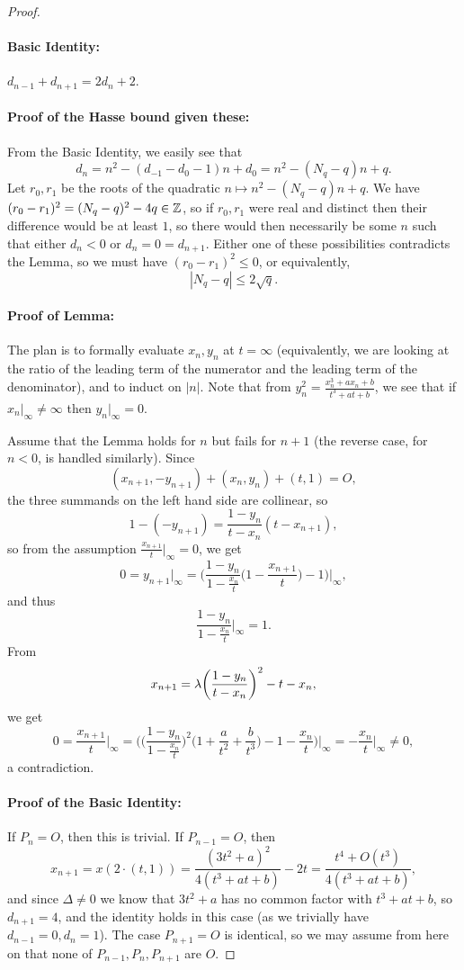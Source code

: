 \begin{proof}
\paragraph{Basic Identity:} $d_{n-1} + d_{n+1} = 2d_n + 2$.
\paragraph{Proof of the Hasse bound given these:} From the Basic Identity, we easily see that
\[
d_n = n^2 - (d_{-1}-d_0-1)n + d_0 = n^2 - (N_q-q)n + q.
\]
Let $r_0, r_1$ be the roots of the quadratic $n\mapsto n^2 - (N_q-q)n + q$. We have $(r_0-r_1)^2 = (N_q-q)^2-4q \in \mathbb{Z}$, so if $r_0,r_1$ were real and distinct then their difference would be at least $1$, so there would then necessarily be some $n$ such that either $d_n < 0$ or $d_n = 0 = d_{n+1}$. Either one of these possibilities contradicts the Lemma, so we must have $(r_0-r_1)^2 \le 0$, or equivalently,
\[
|N_q-q| \le 2\sqrt{q}.
\]
\paragraph{Proof of Lemma:} The plan is to formally evaluate $x_n, y_n$ at $t=\infty$ (equivalently, we are looking at the ratio of the leading term of the numerator and the leading term of the denominator), and to induct on $|n|$. Note that from $y_n^2 = \frac{x_n^3+ax_n+b}{t^3+at+b}$, we see that if $x_n|_\infty \ne \infty$ then $y_n|_\infty = 0$.

Assume that the Lemma holds for $n$ but fails for $n+1$ (the reverse case, for $n < 0$, is handled similarly). Since
\[
(x_{n+1},-y_{n+1}) + (x_n,y_n) + (t,1) = O,
\]
the three summands on the left hand side are collinear, so
\[
1-(-y_{n+1}) = \frac{1-y_n}{t-x_n}(t-x_{n+1}),
\]
so from the assumption $\frac{x_{n+1}}{t}|_\infty = 0$, we get
\[
0 = y_{n+1}|_\infty = \bigg(\frac{1-y_n}{1-\frac{x_n}{t}}\Big(1-\frac{x_{n+1}}{t}\Big)-1\bigg)\bigg|_\infty,
\]
and thus
\[
\frac{1-y_n}{1-\frac{x_n}{t}}\Big|_\infty = 1.
\]
From
\[
x_{n+1} = \lambda\bigg(\frac{1-y_n}{t-x_n}\bigg)^2-t-x_n,
\]
we get
\[
0 = \frac{x_{n+1}}{t}\Big|_\infty = \bigg(\Big(\frac{1-y_n}{1-\frac{x_n}{t}}\Big)^2\Big(1 + \frac{a}{t^2} + \frac{b}{t^3}\Big) - 1 - \frac{x_n}{t}\bigg)\bigg|_\infty = -\frac{x_n}{t}\Big|_\infty \ne 0,
\]
a contradiction.
\paragraph{Proof of the Basic Identity:} If $P_n = O$, then this is trivial. If $P_{n-1} = O$, then
\[
x_{n+1} = x(2\cdot(t,1)) = \frac{(3t^2+a)^2}{4(t^3+at+b)} - 2t = \frac{t^4+O(t^3)}{4(t^3+at+b)},
\]
and since $\Delta \ne 0$ we know that $3t^2+a$ has no common factor with $t^3+at+b$, so $d_{n+1} = 4$, and the identity holds in this case (as we trivially have $d_{n-1} = 0, d_n = 1$). The case $P_{n+1} = O$ is identical, so we may assume from here on that none of $P_{n-1},P_n,P_{n+1}$ are $O$.


\end{proof}
